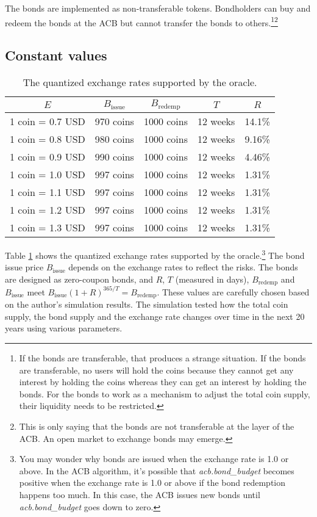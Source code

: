 \documentclass[dvipdfmx,a4paper]{article}
\begin{document}
The bonds are implemented as non-transferable tokens. Bondholders can buy and redeem the bonds at the ACB but cannot transfer the bonds to others.\footnote{ If the bonds are transferable, that produces a strange situation. If the bonds are transferable, no users will hold the coins because they cannot get any interest by holding the coins whereas they can get an interest by holding the bonds. For the bonds to work as a mechanism to adjust the total coin supply, their liquidity needs to be restricted.}\footnote{This is only saying that the bonds are not transferable at the layer of the ACB. An open market to exchange bonds may emerge.}

\subsection{Constant values}

\begin{table}[htb]
\begin{center}
\caption{The quantized exchange rates supported by the oracle.}\vspace{2ex}
\begin{tabular}{rrrrr}\hline
\multicolumn{1}{c}{$E$} & \multicolumn{1}{c}{$B_{\mathrm{issue}}$} & \multicolumn{1}{c}{$B_{\mathrm{redemp}}$} & \multicolumn{1}{c}{$T$} & \multicolumn{1}{c}{$R$}\\\hline
1 coin = 0.7 USD & 970 coins & 1000 coins & 12 weeks & 14.1\%\\
1 coin = 0.8 USD & 980 coins & 1000 coins & 12 weeks & 9.16\%\\
1 coin = 0.9 USD & 990 coins & 1000 coins & 12 weeks & 4.46\%\\
1 coin = 1.0 USD & 997 coins & 1000 coins & 12 weeks & 1.31\%\\
1 coin = 1.1 USD & 997 coins & 1000 coins & 12 weeks & 1.31\%\\
1 coin = 1.2 USD & 997 coins & 1000 coins & 12 weeks & 1.31\%\\
1 coin = 1.3 USD & 997 coins & 1000 coins & 12 weeks & 1.31\%\\\hline
\end{tabular}
\label{table1}
\end{center}
\end{table}

Table \ref{table1} shows the quantized exchange rates supported by the oracle.\footnote{You may wonder why bonds are issued when the exchange rate is 1.0 or above. In the ACB algorithm, it's possible that \textit{acb.bond\_budget} becomes positive when the exchange rate is 1.0 or above if the bond redemption happens too much. In this case, the ACB issues new bonds until \textit{acb.bond\_budget} goes down to zero.} The bond issue price $B_{\mathrm{issue}}$ depends on the exchange rates to reflect the risks. The bonds are designed as zero-coupon bonds, and $R$, $T$ (measured in days), $B_{\mathrm{redemp}}$ and $B_{\mathrm{issue}}$ meet $B_{\mathrm{issue}}(1+R)^{365/T}=B_{\mathrm{redemp}}$. These values are carefully chosen based on the author's simulation results. The simulation tested how the total coin supply, the bond supply and the exchange rate changes over time in the next 20 years using various parameters.
\end{document}
